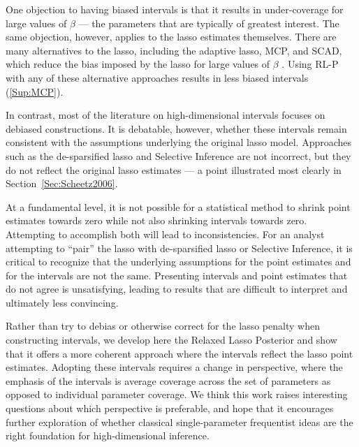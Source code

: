 One objection to having biased intervals is that it results in under-coverage for large values of $\beta$ --- the parameters that are typically of greatest interest. The same objection, however, applies to the lasso estimates themselves. There are many alternatives to the lasso, including the adaptive lasso, MCP, and SCAD, which reduce the bias imposed by the lasso for large values of $\beta$ \citep{Zou2006, Zhang2010, Fan2001}. Using RL-P with any of these alternative approaches results in less biased intervals (\ref{Sup:MCP}).

In contrast, most of the literature on high-dimensional intervals focuses on debiased constructions. It is debatable, however, whether these intervals remain consistent with the assumptions underlying the original lasso model. Approaches such as the de-sparsified lasso and Selective Inference are not incorrect, but they do not reflect the original lasso estimates --- a point illustrated most clearly in Section~\ref{Sec:Scheetz2006}.

At a fundamental level, it is not possible for a statistical method to shrink point estimates towards zero while not also shrinking intervals towards zero. Attempting to accomplish both will lead to inconsistencies. For an analyst attempting to ``pair'' the lasso with de-sparsified lasso or Selective Inference, it is critical to recognize that the underlying assumptions for the point estimates and for the intervals are not the same. Presenting intervals and point estimates that do not agree is unsatisfying, leading to results that are difficult to interpret and ultimately less convincing.

Rather than try to debias or otherwise correct for the lasso penalty when constructing intervals, we develop here the Relaxed Lasso Posterior and show that it offers a more coherent approach where the intervals reflect the lasso point estimates. Adopting these intervals requires a change in perspective, where the emphasis of the intervals is average coverage across the set of parameters as opposed to individual parameter coverage. We think this work raises interesting questions about which perspective is preferable, and hope that it encourages further exploration of whether classical single-parameter frequentist ideas are the right foundation for high-dimensional inference.